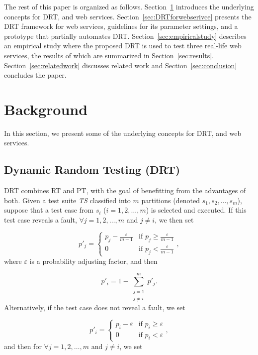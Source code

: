 \documentclass[10pt,journal,compsoc]{IEEEtran}
\begin{document}
The rest of this paper is organized as follows.
Section~\ref{sec:background} introduces the underlying concepts for DRT, and web services.
Section~\ref{sec:DRTforwebserivce} presents the DRT framework for web services, guidelines for its parameter settings, and a prototype that partially automates DRT.
Section~\ref{sec:empiricalstudy} describes an empirical study where the proposed DRT is used to test three real-life web services, the results of which are summarized in Section~\ref{sec:results}.
Section~\ref{sec:relatedwork} discusses related work and Section~\ref{sec:conclusion} concludes the paper.

\section{Background}
\label{sec:background}

In this section, we present some of the underlying concepts for DRT, and web services.

\subsection{Dynamic Random Testing (DRT)}
\label{sec:DRTStrategy}

DRT combines RT and PT, with the goal of benefitting from the advantages of both.
Given a test suite \emph{TS} classified into $m$ partitions (denoted $s_1, s_2, \ldots, s_m$),  suppose that a test case from $s_i$ ($i = 1, 2, \ldots, m$) is selected and executed.
If this test case reveals a fault, $\forall j = 1, 2, \ldots, m$ and $j \neq i$, we then set

\begin{equation}
\label{eq:DRThitJ}
p'_j =
\begin{cases}
p_j - \displaystyle\frac{\varepsilon}{m-1} & \text{if } p_j \geq \displaystyle\frac{\varepsilon}{m-1} \\
0 & \text{if } p_j < \displaystyle\frac{\varepsilon}{m-1}
\end{cases},
\end{equation}
where $\varepsilon$ is a probability adjusting factor, and then

\begin{equation}
\label{eq:DRThitI}
  p'_i = 1 - \sum_{\substack{j = 1 \\ j \neq i}}^m p'_j.
\end{equation}
Alternatively, if the test case does not reveal a fault, we set

\begin{equation}
\label{eq:DRTmissI}
p'_i =
\begin{cases}
p_i - \varepsilon & \text{if } p_i \geq \varepsilon \\
0 & \text{if } p_i < \varepsilon
\end{cases},
\end{equation}
and then for $\forall j = 1, 2, \ldots, m$ and $j \neq i$, we set
\end{document}
